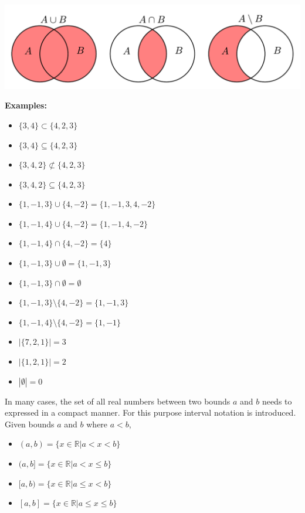 \documentclass{article}
\begin{document}
\includegraphics[width = \textwidth]{set_operations}

\textbf{Examples:}
\begin{itemize}
\item \(\{3, 4\} \subset \{4, 2, 3\}\)
\item \(\{3, 4\} \subseteq \{4, 2, 3\}\)
\item \(\{3, 4, 2\} \not\subset \{4, 2, 3\}\)
\item \(\{3, 4, 2\} \subseteq \{4, 2, 3\}\)
\item \(\{1, -1, 3\} \cup \{4, -2\} = \{1, -1, 3, 4, -2\}\)
\item \(\{1, -1, 4\} \cup \{4, -2\} = \{1, -1, 4, -2\}\)
\item \(\{1, -1, 4\} \cap \{4, -2\} = \{4\}\)
\item \(\{1, -1, 3\} \cup \emptyset = \{1, -1, 3\}\)
\item \(\{1, -1, 3\} \cap \emptyset = \emptyset\)
\item \(\{1, -1, 3\} \setminus \{4, -2\} = \{1, -1, 3\}\)
\item \(\{1, -1, 4\} \setminus \{4, -2\} = \{1, -1\}\)
\item \(|\{7, 2, 1\}| = 3\)
\item \(|\{1, 2, 1\}| = 2\)
\item \(|\emptyset| = 0\)
\end{itemize}

In many cases, the set of all real numbers between two bounds \(a\) and \(b\) needs to expressed in a compact manner. For this purpose interval notation is introduced. Given bounds \(a\) and \(b\) where \(a < b\),
\begin{itemize}
\item \((a, b) = \{x \in \mathbb{R} | a < x < b\}\)
\item \((a, b] = \{x \in \mathbb{R} | a < x \leq b\}\)
\item \([a, b) = \{x \in \mathbb{R} | a \leq x < b\}\)
\item \([a, b] = \{x \in \mathbb{R} | a \leq x \leq b\}\)
\end{itemize}
\end{document}

